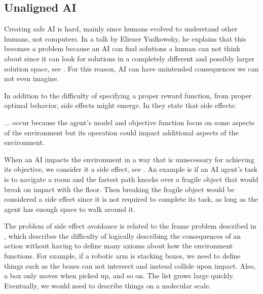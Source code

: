 \documentclass[12pt,A4]{report}
\theoremstyle{definition}
\begin{document}
\subsection{Unaligned AI}
Creating safe AI is hard, mainly since humans evolved to understand other humans, not computers. In a talk by Eliezer Yudkowsky, he explains that this becomes a problem because an AI can find solutions a human can not think about since it can look for solutions in a completely different and possibly larger solution space, see \citet{Yudkowsky16}. For this reason, AI can have unintended consequences we can not even imagine. 

In addition to the difficulty of specifying a proper reward function, from proper optimal behavior, side effects might emerge. In \citet{Saisubramanian} they state that side effects:
\begin{displayquote}
  ... occur because the agent's model and objective function focus on some aspects of the environment but its operation could impact additional aspects of the environment.
\end{displayquote}

When an AI impacts the environment in a way that is unnecessary for achieving its objective, we consider it a side effect, see \citet{Amodei}. An example is if an AI agent's task is to navigate a room and the fastest path knocks over a fragile object that would break on impact with the floor. Then breaking the fragile object would be considered a side effect since it is not required to complete its task, as long as the agent has enough space to walk around it. 

The problem of side effect avoidance is related to the frame problem described in \citet{Mc69}, which describes the difficulty of logically describing the consequences of an action without having to define many axioms about how the environment functions. For example, if a robotic arm is stacking boxes, we need to define things such as the boxes can not intersect and instead collide upon impact. Also, a box only moves when picked up, and so on. The list grows large quickly. Eventually, we would need to describe things on a molecular scale.
\end{document}
